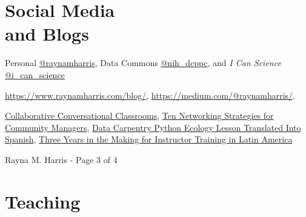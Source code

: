 \documentclass[margin,line]{CV}
\begin{document}
\begin{resume}

\section{\mysidestyle Social Media\\and Blogs}

\begin{description}{}{
\setlength{\leftmargin}{1cm}%
\setlength{\itemindent}{-1cm}
}
\setlength{\itemsep}{3pt}
\item[Twitter:] Personal \href{http://twitter.com/raynamharris}{@raynamharris}, Data Commons \href{https://twitter.com/nih_dcppc}{@nih\_dcppc}, and \textit{I Can Science} \href{https://twitter.com/i_can_science}{@i\_can\_science}
\item[Blog:] \url{https://www.raynamharris.com/blog/}, \url{https://medium.com/@raynamharris/}. \item[Selected blog posts:]
\href{https://www.raynamharris.com/blog/colab-convos/}{Collaborative Conversational Classrooms}, 
\href{https://www.raynamharris.com/blog/cefpnetworking/}{Ten Networking Strategies for Community Managers}, 
\href{https://www.raynamharris.com/blog/lessontranslation/}{Data Carpentry Python Ecology Lesson Translated Into Spanish},  \href{https://www.raynamharris.com/blog/spanishTTT/}{Three Years in the Making for Instructor Training in Latin America} 

\end{description}



\vspace{0.7 cm}
{\centerline {Rayna M. Harris - Page 3 of 4}}
\newpage



    
\section{\mysidestyle Teaching}




\end{resume}
\end{document}
